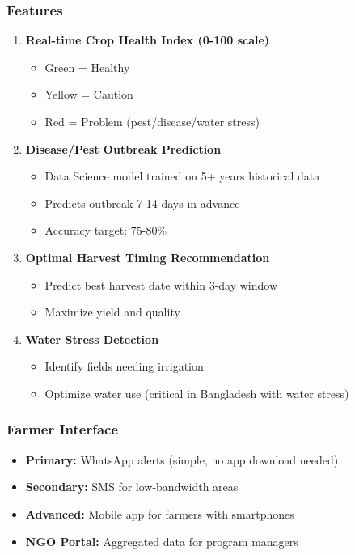 \subsubsection{Features}

\begin{enumerate}
    \item \textbf{Real-time Crop Health Index (0-100 scale)}
        \begin{itemize}
            \item Green = Healthy
            \item Yellow = Caution
            \item Red = Problem (pest/disease/water stress)
        \end{itemize}

    \item \textbf{Disease/Pest Outbreak Prediction}
        \begin{itemize}
            \item Data Science model trained on 5+ years historical data
            \item Predicts outbreak 7-14 days in advance
            \item Accuracy target: 75-80\%
        \end{itemize}

    \item \textbf{Optimal Harvest Timing Recommendation}
        \begin{itemize}
            \item Predict best harvest date within 3-day window
            \item Maximize yield and quality
        \end{itemize}

    \item \textbf{Water Stress Detection}
        \begin{itemize}
            \item Identify fields needing irrigation
            \item Optimize water use (critical in Bangladesh with water stress)
        \end{itemize}
\end{enumerate}

\subsubsection{Farmer Interface}

\begin{itemize}
    \item \textbf{Primary:} WhatsApp alerts (simple, no app download needed)
    \item \textbf{Secondary:} SMS for low-bandwidth areas
    \item \textbf{Advanced:} Mobile app for farmers with smartphones
    \item \textbf{NGO Portal:} Aggregated data for program managers
\end{itemize}

